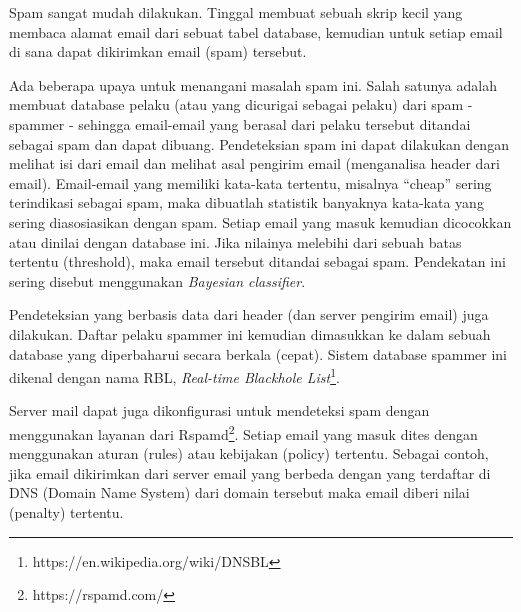 Spam sangat mudah dilakukan. Tinggal membuat sebuah skrip kecil yang membaca
alamat email dari sebuat tabel database, kemudian untuk setiap email di sana
dapat dikirimkan email (spam) tersebut.

Ada beberapa upaya untuk menangani masalah spam ini. Salah satunya adalah
membuat database pelaku (atau yang dicurigai sebagai pelaku) dari spam -
spammer - sehingga email-email yang berasal dari pelaku tersebut ditandai
sebagai spam dan dapat dibuang. Pendeteksian spam ini dapat dilakukan dengan
melihat isi dari email dan melihat asal pengirim email (menganalisa header dari
email). Email-email yang memiliki kata-kata tertentu, misalnya ``cheap'' sering
terindikasi sebagai spam, maka dibuatlah statistik banyaknya kata-kata yang sering
diasosiasikan dengan spam. Setiap email yang masuk kemudian dicocokkan atau
dinilai dengan database ini. Jika nilainya melebihi dari sebuah batas tertentu
(threshold), maka email tersebut ditandai sebagai spam. Pendekatan ini sering
disebut menggunakan {\em Bayesian classifier}.

Pendeteksian yang berbasis data dari header (dan server pengirim email) juga
dilakukan. Daftar pelaku spammer ini kemudian dimasukkan ke dalam sebuah
database yang diperbaharui secara berkala (cepat). Sistem database spammer ini
dikenal dengan nama RBL, {\em Real-time Blackhole
List}\footnote{https://en.wikipedia.org/wiki/DNSBL}.

Server mail dapat juga dikonfigurasi untuk mendeteksi spam dengan menggunakan
layanan dari Rspamd\footnote{https://rspamd.com/}. Setiap email yang masuk
dites dengan menggunakan aturan (rules) atau kebijakan (policy) tertentu.
Sebagai contoh, jika email dikirimkan dari server email yang berbeda dengan
yang terdaftar di DNS (Domain Name System) dari domain tersebut maka email
diberi nilai (penalty) tertentu.
